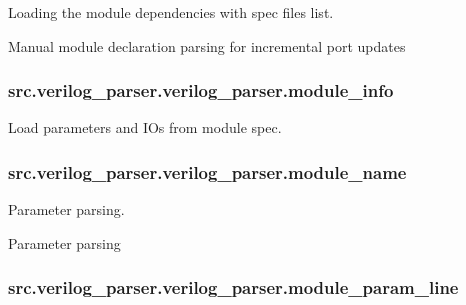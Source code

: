 Loading the module dependencies with spec files list. 

Manual module declaration parsing for incremental port updates \hypertarget{classsrc_1_1verilog__parser_1_1verilog__parser_a9e6de26b5fd6ad1ab65b4ed97cd6c078}{
\subsubsection[{module\-\_\-info}]{\setlength{\rightskip}{0pt plus 5cm}src.\-verilog\-\_\-parser.\-verilog\-\_\-parser.\-module\-\_\-info}}\label{classsrc_1_1verilog__parser_1_1verilog__parser_a9e6de26b5fd6ad1ab65b4ed97cd6c078}


Load parameters and I\-Os from module spec. 

\hypertarget{classsrc_1_1verilog__parser_1_1verilog__parser_a517fc26126209e45aa5eefee4e937fd5}{
\subsubsection[{module\-\_\-name}]{\setlength{\rightskip}{0pt plus 5cm}src.\-verilog\-\_\-parser.\-verilog\-\_\-parser.\-module\-\_\-name}}\label{classsrc_1_1verilog__parser_1_1verilog__parser_a517fc26126209e45aa5eefee4e937fd5}


Parameter parsing. 

Parameter parsing \hypertarget{classsrc_1_1verilog__parser_1_1verilog__parser_a833a3acd432dbf02d6c9f4333bcafba2}{
\subsubsection[{module\-\_\-param\-\_\-line}]{\setlength{\rightskip}{0pt plus 5cm}src.\-verilog\-\_\-parser.\-verilog\-\_\-parser.\-module\-\_\-param\-\_\-line}}\label{classsrc_1_1verilog__parser_1_1verilog__parser_a833a3acd432dbf02d6c9f4333bcafba2}


